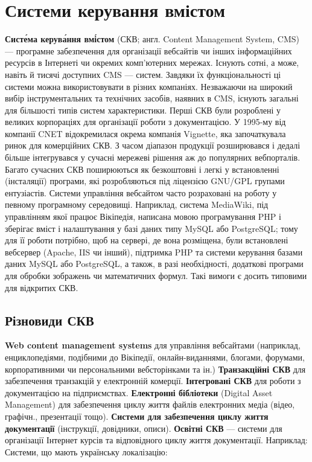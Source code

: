	\section {Системи керування вмістом}

\textbf{Систе́ма керува́ння вмі́стом} (СКВ; англ. Content Management System, CMS) — програмне забезпечення для організації вебсайтів чи інших інформаційних ресурсів в Інтернеті чи окремих комп'ютерних мережах.
Існують сотні, а може, навіть й тисячі доступних CMS — систем. Завдяки їх функціональності ці системи можна використовувати в різних компаніях. Незважаючи на широкий вибір інструментальних та технічних засобів, наявних в CMS, існують загальні для більшості типів систем характеристики.
Перші СКВ були розроблені у великих корпораціях для організації роботи з документацією. У 1995-му від компанії CNET відокремилася окрема компанія Vignette, яка започаткувала ринок для комерційних СКВ. З часом діапазон продукції розширювався і дедалі більше інтегрувався у сучасні мережеві рішення аж до популярних вебпорталів.
Багато сучасних СКВ поширюються як безкоштовні і легкі у встановленні (інсталяції) програми, які розробляються під ліцензією GNU/GPL групами ентузіастів.
Системи управління вебсайтом часто розраховані на роботу у певному програмному середовищі. Наприклад, система MediaWiki, під управлінням якої працює Вікіпедія, написана мовою програмування PHP і зберігає вміст і налаштування у базі даних типу MySQL або PostgreSQL; тому для її роботи потрібно, щоб на сервері, де вона розміщена, були встановлені вебсервер (Apache, IIS чи інший), підтримка PHP та системи керування базами даних MySQL або PostgreSQL, а також, в разі необхідності, додаткові програми для обробки зображень чи математичних формул. Такі вимоги є досить типовими для відкритих СКВ.
\subsection {Різновиди СКВ}
\textbf{Web content management systems} для управління вебсайтами (наприклад, енциклопедіями, подібними до Вікіпедії, онлайн-виданнями, блогами, форумами, корпоративними чи персональними вебсторінками та ін.)
\textbf{Транзакційні СКВ} для забезпечення транзакцій у електронній комерції.
\textbf{Інтегровані СКВ} для роботи з документацією на підприємствах.
\textbf{Електронні бібліотеки} (Digital Asset Management) для забезпечення циклу життя файлів електронних медіа (відео, графічн., презентації тощо).
\textbf{Системи для забезпечення циклу життя документації} (інструкції, довідники, описи).
\textbf{Освітні СКВ} — системи для організації Інтернет курсів та відповідного циклу життя документації. Наприклад:
Системи, що мають українську локалізацію:

